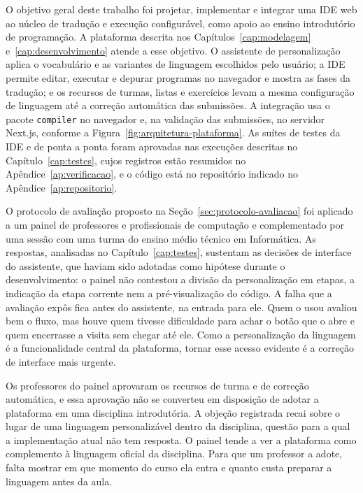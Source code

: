 O objetivo geral deste trabalho foi projetar, implementar e integrar uma IDE web ao núcleo de tradução e execução configurável, como apoio ao ensino introdutório de programação. A plataforma descrita nos Capítulos~\ref{cap:modelagem} e~\ref{cap:desenvolvimento} atende a esse objetivo. O assistente de personalização aplica o vocabulário e as variantes de linguagem escolhidos pelo usuário; a IDE permite editar, executar e depurar programas no navegador e mostra as fases da tradução; e os recursos de turmas, listas e exercícios levam a mesma configuração de linguagem até a correção automática das submissões. A integração usa o pacote \texttt{compiler} no navegador e, na validação das submissões, no servidor Next.js, conforme a Figura~\ref{fig:arquitetura-plataforma}. As suítes de testes da IDE e de ponta a ponta foram aprovadas nas execuções descritas no Capítulo~\ref{cap:testes}, cujos registros estão resumidos no Apêndice~\ref{ap:verificacao}, e o código está no repositório indicado no Apêndice~\ref{ap:repositorio}.

O protocolo de avaliação proposto na Seção~\ref{sec:protocolo-avaliacao} foi aplicado a um painel de professores e profissionais de computação e complementado por uma sessão com uma turma do ensino médio técnico em Informática. As respostas, analisadas no Capítulo~\ref{cap:testes}, sustentam as decisões de interface do assistente, que haviam sido adotadas como hipótese durante o desenvolvimento: o painel não contestou a divisão da personalização em etapas, a indicação da etapa corrente nem a pré-visualização do código. A falha que a avaliação expôs fica antes do assistente, na entrada para ele. Quem o usou avaliou bem o fluxo, mas houve quem tivesse dificuldade para achar o botão que o abre e quem encerrasse a visita sem chegar até ele. Como a personalização da linguagem é a funcionalidade central da plataforma, tornar esse acesso evidente é a correção de interface mais urgente.

Os professores do painel aprovaram os recursos de turma e de correção automática, e essa aprovação não se converteu em disposição de adotar a plataforma em uma disciplina introdutória. A objeção registrada recai sobre o lugar de uma linguagem personalizável dentro da disciplina, questão para a qual a implementação atual não tem resposta. O painel tende a ver a plataforma como complemento à linguagem oficial da disciplina. Para que um professor a adote, falta mostrar em que momento do curso ela entra e quanto custa preparar a linguagem antes da aula.

